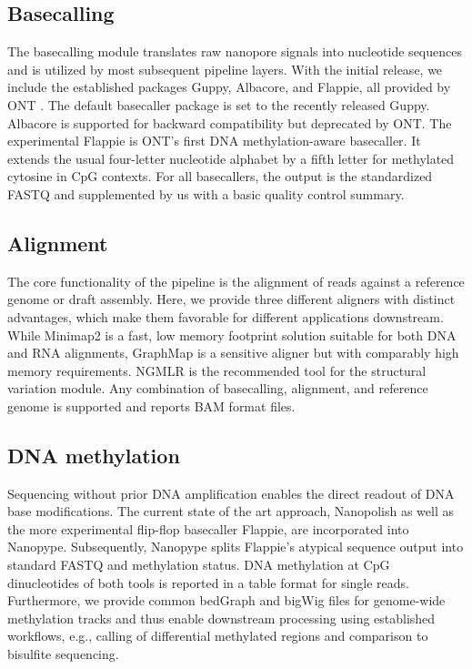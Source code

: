 \subsection{Basecalling}
\label{subsec:nanopype:basecalling}
The basecalling module translates raw nanopore signals into nucleotide sequences and is utilized by most subsequent pipeline layers. With the initial release, we include the established packages Guppy, Albacore, and Flappie, all provided by ONT \cite{Wick2019}. The default basecaller package is set to the recently released Guppy. Albacore is supported for backward compatibility but deprecated by ONT. The experimental Flappie is ONT’s first DNA methylation-aware basecaller. It extends the usual four-letter nucleotide alphabet by a fifth letter for methylated cytosine in CpG contexts. For all basecallers, the output is the standardized FASTQ and supplemented by us with a basic quality control summary.


\subsection{Alignment}
\label{subsec:nanopype:alignment}
The core functionality of the pipeline is the alignment of reads against a reference genome or draft assembly. Here, we provide three different aligners with distinct advantages, which make them favorable for different applications downstream. While Minimap2 \cite{Li2018} is a fast, low memory footprint solution suitable for both DNA and RNA alignments, GraphMap \cite{Sovic2016} is a sensitive aligner but with comparably high memory requirements. NGMLR \cite{Sedlazeck2018} is the recommended tool for the structural variation module. Any combination of basecalling, alignment, and reference genome is supported and reports BAM format files.


\subsection{DNA methylation}
\label{subsec:nanopype:methylation}
Sequencing without prior DNA amplification enables the direct readout of DNA base modifications. The current state of the art approach, Nanopolish \cite{Simpson2017} as well as the more experimental flip-flop basecaller Flappie, are incorporated into Nanopype. Subsequently, Nanopype splits Flappie’s atypical sequence output into standard FASTQ and methylation status. DNA methylation at CpG dinucleotides of both tools is reported in a table format for single reads. Furthermore, we provide common bedGraph and bigWig files for genome-wide methylation tracks and thus enable downstream processing using established workflows, e.g., calling of differential methylated regions and comparison to bisulfite sequencing.

